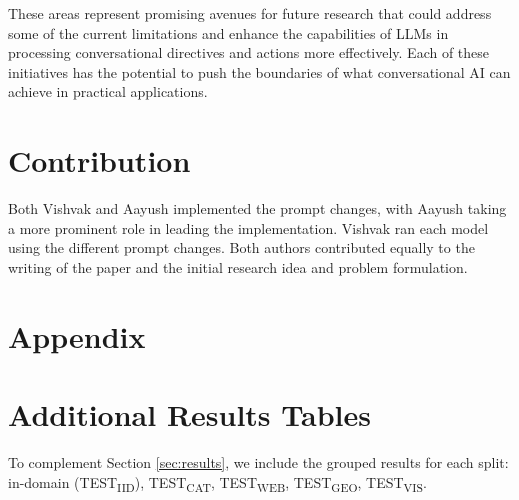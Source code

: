 \documentclass[11pt]{article}
\begin{document}
These areas represent promising avenues for future research that could address some of the current limitations and enhance the capabilities of LLMs in processing conversational directives and actions more effectively. Each of these initiatives has the potential to push the boundaries of what conversational AI can achieve in practical applications.


\section{Contribution}
Both Vishvak and Aayush implemented the prompt changes, with Aayush taking a more prominent role in leading the implementation. Vishvak ran each model using the different prompt changes. Both authors contributed equally to the writing of the paper and the initial research idea and problem formulation.





\clearpage
\onecolumn
\appendix
\section*{Appendix} %

\section{Additional Results Tables} \label{sec:add_res}


To complement Section \ref{sec:results}, we include the grouped results for each split: in-domain (TEST\textsubscript{IID}), TEST\textsubscript{CAT}, TEST\textsubscript{WEB}, TEST\textsubscript{GEO}, TEST\textsubscript{VIS}. 
\end{document}

